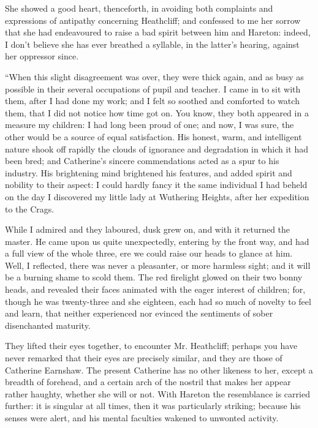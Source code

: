 \par She showed a good heart, thenceforth, in avoiding both complaints and expressions of antipathy concerning Heathcliff; and confessed to me her sorrow that she had endeavoured to raise a bad spirit between him and Hareton: indeed, I don't believe she has ever breathed a syllable, in the latter's hearing, against her oppressor since.
\par “When this slight disagreement was over, they were thick again, and as busy as possible in their several occupations of pupil and teacher. I came in to sit with them, after I had done my work; and I felt so soothed and comforted to watch them, that I did not notice how time got on. You know, they both appeared in a measure my children: I had long been proud of one; and now, I was sure, the other would be a source of equal satisfaction. His honest, warm, and intelligent nature shook off rapidly the clouds of ignorance and degradation in which it had been bred; and Catherine's sincere commendations acted as a spur to his industry. His brightening mind brightened his features, and added spirit and nobility to their aspect: I could hardly fancy it the same individual I had beheld on the day I discovered my little lady at Wuthering Heights, after her expedition to the Crags.
\par While I admired and they laboured, dusk grew on, and with it returned the master. He came upon us quite unexpectedly, entering by the front way, and had a full view of the whole three, ere we could raise our heads to glance at him. Well, I reflected, there was never a pleasanter, or more harmless sight; and it will be a burning shame to scold them. The red firelight glowed on their two bonny heads, and revealed their faces animated with the eager interest of children; for, though he was twenty-three and she eighteen, each had so much of novelty to feel and learn, that neither experienced nor evinced the sentiments of sober disenchanted maturity.
\par They lifted their eyes together, to encounter Mr. Heathcliff; perhaps you have never remarked that their eyes are precisely similar, and they are those of Catherine Earnshaw. The present Catherine has no other likeness to her, except a breadth of forehead, and a certain arch of the nostril that makes her appear rather haughty, whether she will or not. With Hareton the resemblance is carried further: it is singular at all times, then it was particularly striking; because his senses were alert, and his mental faculties wakened to unwonted activity.

